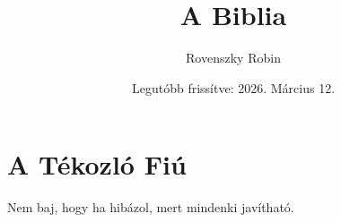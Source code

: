 \documentclass{article}
\title{A Biblia}
\author{Rovenszky Robin}
\date{Legutóbb frissítve: 2026. Március 12.}
\begin{document}
\maketitle

\section{A Tékozló Fiú}
Nem baj, hogy ha hibázol, mert mindenki javítható.\\
\end{document}
